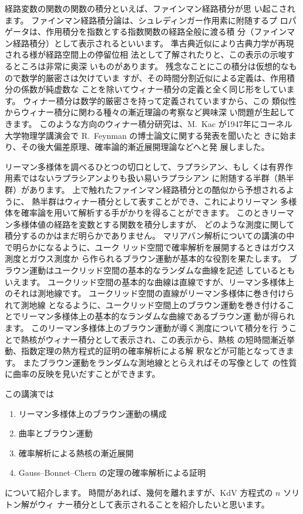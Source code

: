 \documentclass[uplatex,dvipdfmx]{jlreq}
\begin{document}
経路変数の関数の関数の積分といえば、ファインマン経路積分が思
い起こされます。
ファインマン経路積分論は、シュレディンガー作用素に附随するプ
ロパゲータは、作用積分を指数とする指数関数の経路全般に渡る積
分（ファインマン経路積分）として表示されるといいます。
準古典近似により古典力学が再現される様が経路空間上の停留位相
法として了解されたりと、この表示の示唆するところは非常に奥深
いものがあります。
残念なことにこの積分は仮想的なもので数学的厳密さは欠けていま
すが、その時間分割近似による定義は、作用積分の係数が純虚数な
ことを除いてウィナー積分の定義と全く同じ形をしています。
ウィナー積分は数学的厳密さを持って定義されていますから、この
類似性からウィナー積分に関わる種々の漸近理論の考察など興味深
い問題が生起してきます。
このような方向のウィナー積分研究は、M.~Kac が1947年にコーネル
大学物理学講演会で R.~Feynman の博士論文に関する発表を聞いたと
きに始まり、その後大偏差原理、確率論的漸近展開理論などへと発
展しました。

リーマン多様体を調べるひとつの切口として、ラプラシアン、もし
くは有界作用素ではないラプラシアンよりも扱い易いラプラシアン
に附随する半群（熱半群）があります。
上で触れたファインマン経路積分との酷似から予想されるように、
熱半群はウィナー積分として表すことができ、これによりリーマン
多様体を確率論を用いて解析する手がかりを得ることができます。
このときリーマン多様体値の経路を変数とする関数を積分しますが、
どのような測度に関して積分するのかはまだ明らかでありません。
マリアバン解析についての講演の中で明らかになるように、ユーク
リッド空間で確率解析を展開するときはガウス測度とガウス測度か
ら作られるブラウン運動が基本的な役割を果たします。
ブラウン運動はユークリッド空間の基本的なランダムな曲線を記述
しているともいえます。
ユークリッド空間の基本的な曲線は直線ですが、リーマン多様体上
のそれは測地線です。
ユークリッド空間の直線がリーマン多様体に巻き付けられて測地線
となるように、ユークリッド空間上のブラウン運動を巻き付けるこ
とでリーマン多様体上の基本的なランダムな曲線であるブラウン運
動が得られます。
このリーマン多様体上のブラウン運動が導く測度について積分を行
うことで熱核がウィナー積分として表示され、この表示から、熱核
の短時間漸近挙動、指数定理の熱方程式的証明の確率解析による解
釈などが可能となってきます。
またブラウン運動をランダムな測地線ととらえればその写像として
の性質に曲率の反映を見いだすことができます。

この講演では
\begin{enumerate}
\item リーマン多様体上のブラウン運動の構成
\item 曲率とブラウン運動
\item 確率解析による熱核の漸近展開
\item Gauss--Bonnet--Chern の定理の確率解析による証明
\end{enumerate}
について紹介します。
時間があれば、幾何を離れますが、KdV 方程式の $n$ ソリトン解がウィ
ナー積分として表示されることを紹介したいと思います。
\end{document}
